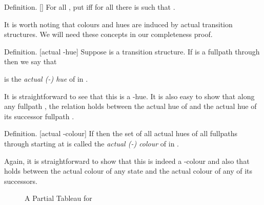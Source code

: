 \documentclass[submission,copyright,creativecommons]{eptcs}
\newenvironment{definition}{Definition. }{}
\begin{document}
\begin{definition}[]
For all ,
put  iff
for all  there is  such that .
\end{definition}

It is worth noting that colours and hues 
are induced by
actual transition structures.
We will need these concepts in our completeness proof.

\begin{definition}[actual -hue]
Suppose  is a transition structure.
If  is a fullpath through  then
we say that 

is the
{\em actual (-) hue}
of  in .
\end{definition}

It is straightforward to see that 
this is a -hue.
It is also easy to show that
along any fullpath ,
the relation
 holds between the actual hue
of 
and 
the actual hue 
of its successor 
fullpath .

\begin{definition}[actual -colour]
If  then
the set of all actual hues 
of all fullpaths through 
starting at 
is called the 
{\em actual (-) colour}
of  in .
\end{definition}

Again, it is straightforward
to show that this is indeed a
-colour
and also that 
holds between the actual colour
of any state and
the actual colour
of any of its successors.

\begin{figure}
\begin{center}

  
\end{center}
\caption{A Partial Tableau for }
\label{fig:egn12}
\end{figure}
\end{document}
